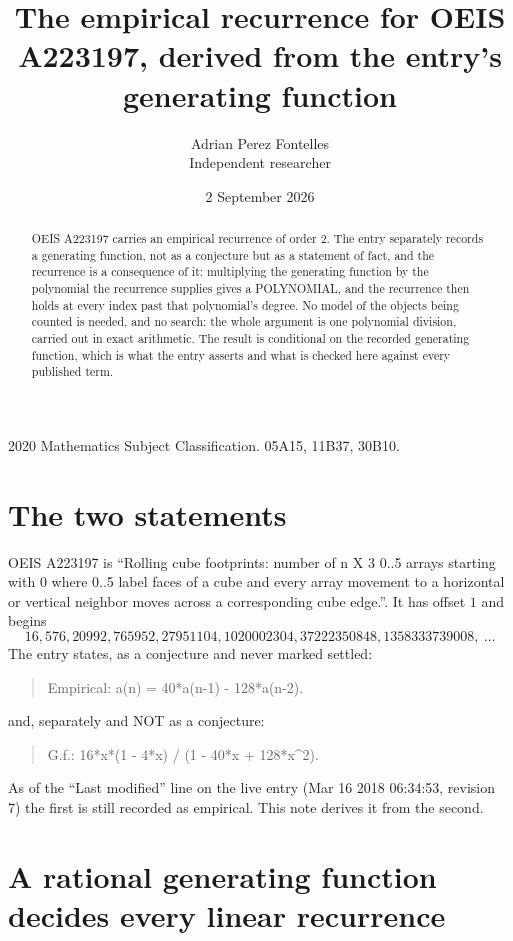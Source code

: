 \documentclass[11pt,a4paper]{article}
\title{The empirical recurrence for OEIS A223197, derived from the entry's generating function}
\author{Adrian Perez Fontelles\\ \small Independent researcher}
\date{2 September 2026}
\theoremstyle{plain}
\theoremstyle{definition}
\begin{document}
\maketitle

\begin{abstract}
OEIS A223197 carries an empirical recurrence of order $2$. The entry separately records a
generating function, not as a conjecture but as a statement of fact, and the recurrence is a
consequence of it: multiplying the generating function by the polynomial the recurrence
supplies gives a POLYNOMIAL, and the recurrence then holds at every index past that
polynomial's degree. No model of the objects being counted is needed, and no search: the
whole argument is one polynomial division, carried out in exact arithmetic. The result is
conditional on the recorded generating function, which is what the entry asserts and what is
checked here against every published term.
\end{abstract}

\noindent\small 2020 Mathematics Subject Classification. 05A15, 11B37, 30B10.\normalsize

\section{The two statements}

OEIS A223197 is ``Rolling cube footprints: number of n X 3 0..5 arrays starting with 0 where 0..5 label faces of a cube and every array movement to a horizontal or vertical neighbor moves across a corresponding cube edge.''. It has offset $1$ and begins
\[
16, 576, 20992, 765952, 27951104, 1020002304, 37222350848, 1358333739008,\ \dots
\]
The entry states, as a conjecture and never marked settled:
\begin{quote}
Empirical: a(n) = 40*a(n-1) - 128*a(n-2).
\end{quote}
and, separately and NOT as a conjecture:
\begin{quote}
G.f.: 16*x*(1 - 4*x) / (1 - 40*x + 128*x\^{}2).
\end{quote}
As of the ``Last modified'' line on the live entry (Mar 16 2018 06:34:53, revision 7) the first is still
recorded as empirical. This note derives it from the second.

\section{A rational generating function decides every linear recurrence}
\end{document}
